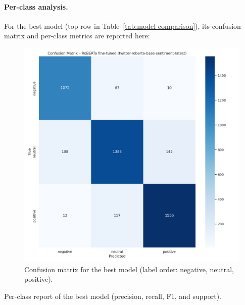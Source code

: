 \documentclass[10pt]{article}
\begin{document}
\paragraph{Per-class analysis.}
For the best model (top row in Table~\ref{tab:model-comparison}), its confusion matrix and per-class metrics are reported here:
\begin{figure}[H]
  \centering
  \includegraphics[width=.80\linewidth]{../SCRITPS/artifacts/figures/best_model_cm.png}
  \caption{Confusion matrix for the best model (label order: negative, neutral, positive).}
  \label{fig:best-confusion}
\end{figure}

\begin{table}[H]
  \centering
  \caption{Per-class report of the best model (precision, recall, F1, and support).}
  \label{tab:best-class-report}
  
\end{table}
\end{document}
